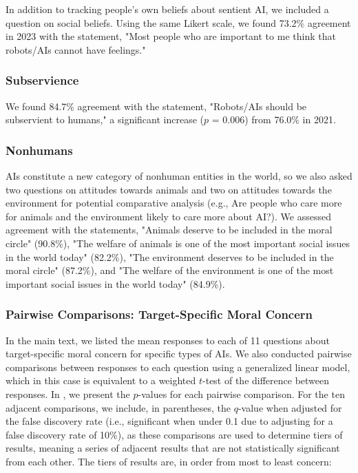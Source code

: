 \documentclass[manuscript,screen,review,nonacm]{acmart}
\begin{document}
In addition to tracking people's own beliefs about sentient AI, we included a question on social beliefs. Using the same Likert scale, we found 73.2\% agreement in 2023 with the statement, "Most people who are important to me think that robots/AIs cannot have feelings."

\subsubsection{Subservience}

We found 84.7\% agreement with the statement, "Robots/AIs should be subservient to humans," a significant increase ($p$ = 0.006) from 76.0\% in 2021.

\subsubsection{Nonhumans}

AIs constitute a new category of nonhuman entities in the world, so we also asked two questions on attitudes towards animals and two on attitudes towards the environment for potential comparative analysis (e.g., Are people who care more for animals and the environment likely to care more about AI?). We assessed agreement with the statements, "Animals deserve to be included in the moral circle" (90.8\%), "The welfare of animals is one of the most important social issues in the world today" (82.2\%), "The environment deserves to be included in the moral circle" (87.2\%), and "The welfare of the environment is one of the most important social issues in the world today" (84.9\%).

\subsubsection{Pairwise Comparisons: Target-Specific Moral Concern}

In the main text, we listed the mean responses to each of 11 questions about target-specific moral concern for specific types of AIs. We also conducted pairwise comparisons between responses to each question using a generalized linear model, which in this case is equivalent to a weighted $t$-test of the difference between responses. In , we present the $p$-values for each pairwise comparison. For the ten adjacent comparisons, we include, in parentheses, the $q$-value when adjusted for the false discovery rate (i.e., significant when under 0.1 due to adjusting for a false discovery rate of 10\%), as these comparisons are used to determine tiers of results, meaning a series of adjacent results that are not statistically significant from each other. The tiers of results are, in order from most to least concern:
\end{document}
